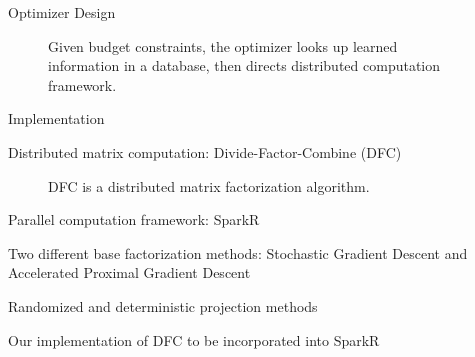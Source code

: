 \documentclass[final]{beamer}
\begin{document}
{\begin{frame}{}
\begin{center}
\begin{columns}[t]
\begin{column}{0.32\textwidth}
\begin{block}{\huge Optimizer Design}
\begin{center}
\begin{figure}
\caption[width=0.6\textwidth]{Given budget constraints, the optimizer looks up learned information in a database, then directs distributed computation framework.}
\end{figure}
\end{center}




\end{block}

\vspace{1.6cm}

    \begin{block}{\huge Implementation}

\vspace{.5cm}
\begin{itemize} {\Large
\item Distributed matrix computation: Divide-Factor-Combine (DFC)
\vspace{.2cm}
\begin{figure}
\caption[width=0.6\textwidth]{DFC is a distributed matrix factorization algorithm.}
\end{figure}
\vspace{.2cm}
\item Parallel computation framework: SparkR
\item Two different base factorization methods: Stochastic Gradient Descent and Accelerated Proximal Gradient Descent
\item Randomized and deterministic projection methods
\item Our implementation of DFC to be incorporated into SparkR}
\end{itemize}
\vspace{.5cm}

    \end{block}



\end{column}
\end{columns}
\end{center}
\end{frame}}
\end{document}
